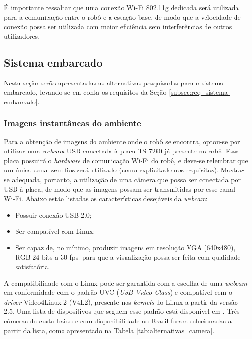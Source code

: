 É importante ressaltar que uma conexão Wi-Fi 802.11g dedicada será utilizada para a comunicação entre o robô e a estação base, de modo que a velocidade de conexão possa ser utilizada com maior eficiência sem interferências de outros utilizadores.


\subsection{Sistema embarcado}
\label{subsec:opcoes_sist-embarcado}
Nesta seção serão apresentadas as alternativas pesquisadas para o sistema embarcado, levando-se em conta os requisitos da Seção \ref{subsec:req_sistema-embarcado}.

\subsubsection{Imagens instantâneas do ambiente}

Para a obtenção de imagens do ambiente onde o robô se encontra, optou-se por utilizar uma \textit{webcam} USB conectada à placa TS-7260 já presente no robô. Essa placa possuirá o \textit{hardware} de comunicação Wi-Fi do robô, e deve-se relembrar que um único canal sem fios será utilizado (como explicitado nos requisitos). Mostra-se adequada, portanto, a utilização de uma câmera que possa ser conectada por USB à placa, de modo que as imagens possam ser transmitidas por esse canal Wi-Fi. Abaixo estão listadas as características desejáveis da \textit{webcam}:

\begin{itemize}
  \item Possuir conexão USB 2.0;
  \item Ser compatível com Linux;
  \item Ser capaz de, no mínimo, produzir imagens em resolução VGA (640x480), RGB 24 bits a 30 fps, para que a visualização possa ser feita com qualidade satisfatória.
\end{itemize}

A compatibilidade com o Linux pode ser garantida com a escolha de uma \textit{webcam} em conformidade com o padrão UVC (\textit{USB Video Class}) e compatível com o \textit{driver} Video4Linux 2 (V4L2), presente nos \textit{kernels} do Linux a partir da versão 2.5. Uma lista de dispositivos que seguem esse padrão está disponível em \cite{uvc-linux}. Três câmeras de custo baixo e com disponibilidade no Brasil foram selecionadas a partir da lista, como apresentado na Tabela \ref{tab:alternativas_camera}.


